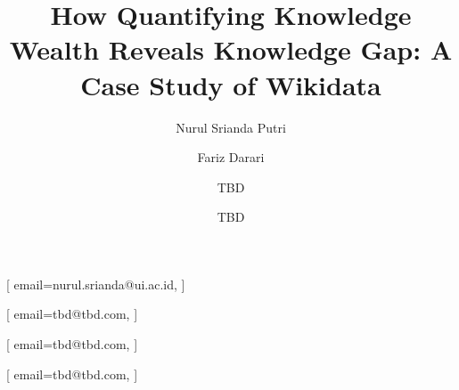 \documentclass[
]{ceurart}
\begin{document}


\title{How Quantifying Knowledge Wealth Reveals Knowledge Gap: A Case Study of Wikidata}


\author[1]{Nurul Srianda Putri}[%
email=nurul.srianda@ui.ac.id,
]
\author[1]{Fariz Darari}[%
email=tbd@tbd.com,
]
\address[1]{TBD}

\author[2]{TBD}[%
email=tbd@tbd.com,
]
\address[2]{TBD}

\author[3]{TBD}[%
email=tbd@tbd.com,
]
\address[3]{TBD}

\end{document}

